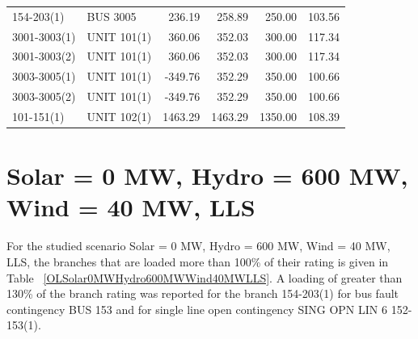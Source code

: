 \documentclass[10pt]{report}
\begin{document}
\begin{table}[H]
{\begin{tabular}{llrrrr}
154-203(1) & BUS 3005 & 236.19 & 258.89 & 250.00 & 103.56 \\
3001-3003(1) & UNIT 101(1) & 360.06 & 352.03 & 300.00 & 117.34 \\
3001-3003(2) & UNIT 101(1) & 360.06 & 352.03 & 300.00 & 117.34 \\
3003-3005(1) & UNIT 101(1) & -349.76 & 352.29 & 350.00 & 100.66 \\
3003-3005(2) & UNIT 101(1) & -349.76 & 352.29 & 350.00 & 100.66 \\
101-151(1) & UNIT 102(1) & 1463.29 & 1463.29 & 1350.00 & 108.39 \\
\bottomrule
\end{tabular}}
\end{table}

\section{Solar = 0 MW, Hydro = 600 MW, Wind = 40 MW, LLS}
For the studied scenario Solar = 0 MW, Hydro = 600 MW, Wind = 40 MW, LLS, the branches that are loaded more than 100\% of their rating is given in Table ~\ref{OLSolar0MWHydro600MWWind40MWLLS}. A loading of greater than 130\% of the branch rating was reported for the branch 154-203(1) for bus fault contingency BUS 153 and for single line open contingency SING OPN LIN   6 152-153(1).
\end{document}
